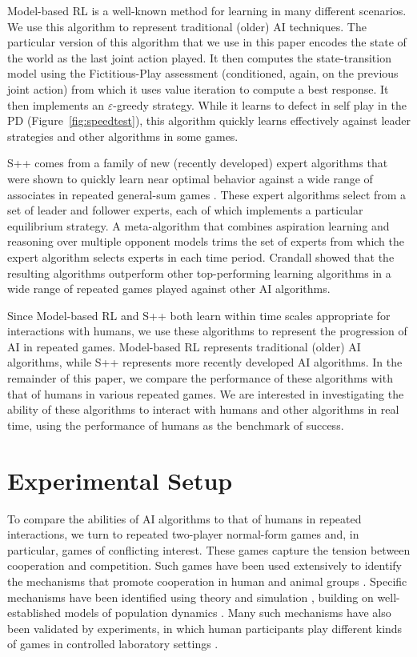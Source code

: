 \documentclass[fleqn,10pt]{SelfArx}
\begin{document}
Model-based RL is a well-known method for learning in many different scenarios.  We use this algorithm to represent traditional (older) AI techniques.  The particular version of this algorithm that we use in this paper encodes the state of the world as the last joint action played.  It then computes the state-transition model using the Fictitious-Play assessment (conditioned, again, on the previous joint action) from which it uses value iteration to compute a best response.  It then implements an $\varepsilon$-greedy strategy.  While it learns to defect in self play in the PD (Figure~\ref{fig:speedtest}), this algorithm quickly learns effectively against leader strategies \cite{LittmanLeaderAlgs} and other algorithms in some games.

S++ comes from a family of new (recently developed) expert algorithms that were shown to quickly learn near optimal behavior against a wide range of associates in repeated general-sum games \cite{Crandall_JAIR2014}.  These expert algorithms select from a set of leader and follower experts, each of which implements a particular equilibrium strategy.  A meta-algorithm that combines aspiration learning and reasoning over multiple opponent models trims the set of experts from which the expert algorithm selects experts in each time period.  Crandall showed that the resulting algorithms outperform other top-performing learning algorithms in a wide range of repeated games played against other AI algorithms.

Since Model-based RL and S++ both learn within time scales appropriate for interactions with humans, we use these algorithms to represent the progression of AI in repeated games.  Model-based RL represents traditional (older) AI algorithms, while S++ represents more recently developed AI algorithms.  In the remainder of this paper, we compare the performance of these algorithms with that of humans in various repeated games.  We are interested in investigating the ability of these algorithms to interact with humans and other algorithms in real time, using the performance of humans as the benchmark of success.


\section{Experimental Setup}
To compare the abilities of AI algorithms to that of humans in repeated interactions, we turn to repeated two-player normal-form games and, in particular, games of conflicting interest.  These games capture the tension between cooperation and competition. Such games have been used extensively to identify the mechanisms that promote cooperation in human and animal groups \cite{Nowak:etal:2011}. Specific mechanisms have been identified using theory and simulation \cite{Nowak:2006}, building on well-established models of population dynamics \cite{Nowak:2006bk}. Many such mechanisms have also been validated by experiments, in which human participants play different kinds of games in controlled laboratory settings \cite{Fehr:etal:2002,Rand:etal:2009,Rand:etal:2011}.
\end{document}
